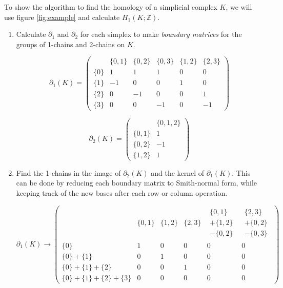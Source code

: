 \documentclass[a4paper,12pt]{report}
\begin{document}
 To show the algorithm to find the homology of a simplicial complex $K$, we will use figure \ref{fig:example} and calculate $H_1(K;\mathbb{Z})$.
 \begin{enumerate}
  \item Calculate $\partial_1$ and $\partial_2$ for each simplex to make \textit{boundary matrices} for the groups of 1-chains and 2-chains on $K$.

\[
\partial_1(K) = \left(
\begin{array}{l|ccccc}
 & \{0,1\} & \{0,2\} & \{0,3\} & \{1,2\} & \{2,3\}\\
 \hline
\{0\} & 1 & 1 & 1 & 0 & 0\\
\{1\} & -1 & 0 & 0 & 1 & 0\\
\{2\} & 0 & -1 & 0 & 0 & 1\\
\{3\} & 0 & 0 & -1 & 0 & -1
 \end{array}\right)
\]

\[ 
\partial_2(K)= \left(
\begin{array}{l|c}
 & \{0,1,2\}\\
 \hline
\{0,1\} & 1\\
\{0,2\} & -1\\
\{1,2\} & 1
 \end{array}\right)
\]

\item Find the 1-chains in the image of $\partial_2(K)$ and the kernel of $\partial_1(K)$. This can be done by reducing each boundary matrix to Smith-normal form, while keeping track of the new bases after each row or column operation.

\[
\partial_1(K) \rightarrow \left(
\begin{array}{l|ccccc}
 & \{0,1\} & \{1,2\} & \{2,3\} & \begin{array}{c}\{0,1\} \\ + \{1,2\} \\ - \{0,2\} \end{array} & \begin{array}{c}\{2,3\} \\ + \{0,2\} \\ - \{0,3\}\end{array}\\
 \hline
\{0\} & 1 & 0 & 0 & 0 & 0\\
\{0\}+\{1\} & 0 & 1 & 0 & 0 & 0\\
\{0\}+\{1\}+\{2\} & 0 & 0 & 1 & 0 & 0\\
\{0\}+\{1\}+\{2\}+\{3\} & 0 & 0 & 0 & 0 & 0
 \end{array}\right)
\]


\end{enumerate}
\end{document}
